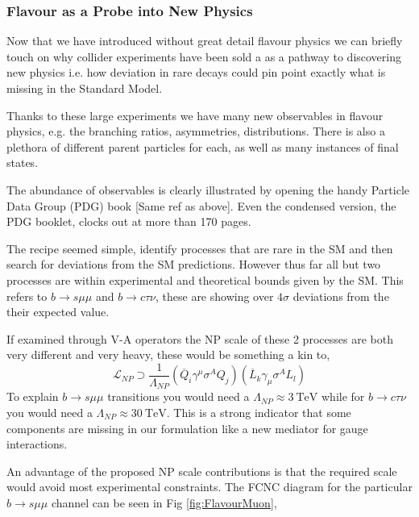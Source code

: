 \subsubsection{Flavour as a Probe into New Physics}

Now that we have introduced without great detail flavour physics we can briefly touch on why collider experiments have been sold a as a pathway to discovering new physics i.e. how deviation in rare decays could pin point exactly what is missing in the Standard Model. 

Thanks to these large experiments we have many new observables in flavour physics, e.g. the branching ratios, asymmetries, distributions. There is also a plethora of different parent particles for each, as well as many instances of final states. 

The abundance of observables is clearly illustrated by opening the handy Particle Data Group (PDG) book [Same ref as above]. Even the condensed version, the PDG booklet, clocks out at more than 170 pages.


The recipe seemed simple, identify processes that are rare in the SM and then search for deviations from the SM predictions. However thus far all but two processes are within experimental and theoretical bounds given by the SM. This refers to $b \rightarrow s \mu \mu$ and $b \rightarrow c \tau \nu$, these are showing over $ 4 \sigma$ deviations from the their expected value. 

{\color{red} 
If examined through V-A operators the NP scale of these 2 processes are both very different and very heavy, these would be something a kin to, 
%
\begin{equation}
\mathcal{L}_{NP} \supset \frac{1}{\Lambda_{NP}} (\overline{Q}_i \gamma^\mu \sigma^A Q_j ) (\overline{L}_k \gamma_\mu \sigma^A L_l) 
\end{equation}
%
To explain $b \rightarrow s \mu \mu$ transitions you would need a $\Lambda_{NP} \approx 3 \ \text{TeV}$ while for $b \rightarrow c \tau \nu$ you would need a $\Lambda_{NP} \approx 30\ \text{TeV}$. This is a strong indicator that some components are missing in our formulation like a new mediator for gauge interactions.  

}

An advantage of the proposed NP scale contributions is that the required scale would avoid most experimental constraints. The FCNC diagram for the particular $b \rightarrow s \mu \mu$ channel can be seen in Fig \ref{fig:FlavourMuon}, 

